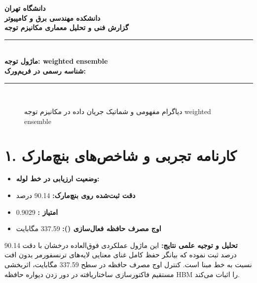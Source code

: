 \documentclass[12pt,a4paper]{article}
\begin{document}
\begin{center}
{\Large\bfseries دانشگاه تهران}\\[0.2cm]
{\large\bfseries دانشکده مهندسی برق و کامپیوتر}\\[0.2cm]
{\large\bfseries گزارش فنی و تحلیل معماری مکانیزم توجه}\\[0.5cm]
\rule{\linewidth}{1pt}\\[0.3cm]
{\LARGE\bfseries ماژول توجه: weighted ensemble}\\[0.2cm]
{\large \textbf{شناسه رسمی در فریم‌ورک:} }\\[0.2cm]
\rule{\linewidth}{1pt}\\[0.5cm]
\end{center}

\begin{figure}[H]
\centering
{}
\caption{دیاگرام مفهومی و شماتیک جریان داده در مکانیزم توجه weighted ensemble}
\end{figure}

\section*{۱. کارنامه تجربی و شاخص‌های بنچ‌مارک}
\begin{itemize}
\item \textbf{وضعیت ارزیابی در خط لوله:} 
\item \textbf{دقت ثبت‌شده روی بنچ‌مارک:} 90.14 درصد
\item \textbf{امتیاز :} 0.9029
\item \textbf{اوج مصرف حافظه فعال‌سازی ():} 337.59 مگابایت
\end{itemize}
\textbf{تحلیل و توجیه علمی نتایج:} این ماژول عملکردی فوق‌العاده درخشان با دقت 90.14 درصد ثبت نموده که بیانگر حفظ کامل غنای معنایی لایه‌های ترنسفورمر بدون افت نسبت به خط مبنا است. کنترل اوج مصرف حافظه در سطح 337.59 مگابایت، اثربخشی مستقیم فاکتورسازی ساختاریافته در دور زدن دیواره حافظه HBM را اثبات می‌کند.
\end{document}
